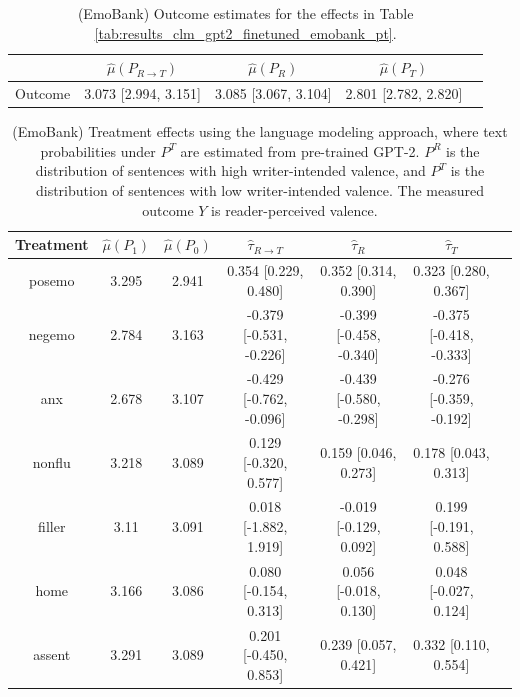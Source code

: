 \documentclass{article}
\begin{document}
\begin{table}[!ht]
\centering
\begin{tabular}{c|cccc}
\toprule
    & $\hat{\mu}(P_{R \rightarrow T})$   & $\hat{\mu}(P_R)$     & $\hat{\mu}(P_T)$     \\
\midrule
    Outcome & 3.073 [2.994, 3.151]               & 3.085 [3.067, 3.104] & 2.801 [2.782, 2.820] \\
\bottomrule
\end{tabular}
\caption{(EmoBank) Outcome estimates for the effects in Table \ref{tab:results_clm_gpt2_finetuned_emobank_pt}.}
\label{tab:results_clm_gpt2_finetuned_emobank_pt_outcome}
\end{table}

\begin{table}[!ht]
\centering
\begin{tabular}{c|cccccc}
\toprule
    Treatment   &   $\hat{\mu}(P_1)$ &   $\hat{\mu}(P_0)$ & $\hat{\tau}_{R \rightarrow T}$   & $\hat{\tau}_R$          & $\hat{\tau}_T$          \\
\midrule
    posemo      &              3.295 &              2.941 & 0.354 [0.229, 0.480]             & 0.352 [0.314, 0.390]    & 0.323 [0.280, 0.367]    \\
    negemo      &              2.784 &              3.163 & -0.379 [-0.531, -0.226]          & -0.399 [-0.458, -0.340] & -0.375 [-0.418, -0.333] \\
    anx         &              2.678 &              3.107 & -0.429 [-0.762, -0.096]          & -0.439 [-0.580, -0.298] & -0.276 [-0.359, -0.192] \\
    nonflu      &              3.218 &              3.089 & 0.129 [-0.320, 0.577]            & 0.159 [0.046, 0.273]    & 0.178 [0.043, 0.313]    \\
    filler      &              3.11  &              3.091 & 0.018 [-1.882, 1.919]            & -0.019 [-0.129, 0.092]  & 0.199 [-0.191, 0.588]   \\
    home        &              3.166 &              3.086 & 0.080 [-0.154, 0.313]            & 0.056 [-0.018, 0.130]   & 0.048 [-0.027, 0.124]   \\
    assent      &              3.291 &              3.089 & 0.201 [-0.450, 0.853]            & 0.239 [0.057, 0.421]    & 0.332 [0.110, 0.554]    \\
\bottomrule
\end{tabular}
\caption{(EmoBank) Treatment effects using the language modeling approach, where text probabilities under $P^T$ are estimated from pre-trained GPT-2. $P^R$ is the distribution of sentences with high writer-intended valence, and $P^T$ is the distribution of sentences with low writer-intended valence. The measured outcome $Y$ is reader-perceived valence.}
\label{tab:results_clm_gpt2_pretrained_emobank}
\end{table}
\end{document}
